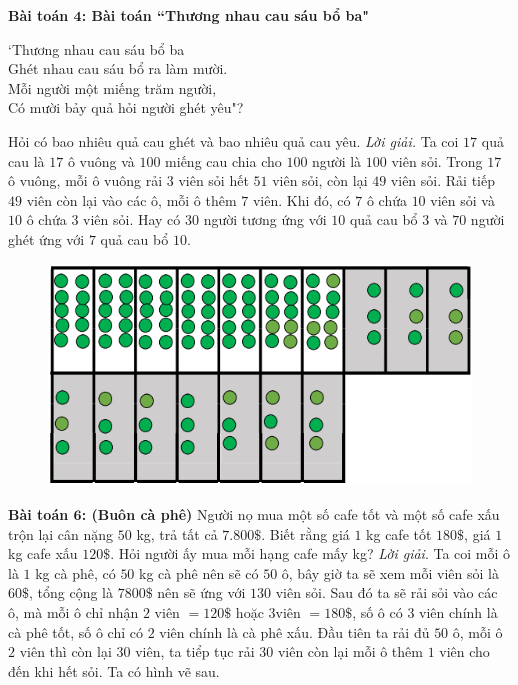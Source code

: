\begin{multicols}{2}
\begin{figure}[H]
		\vspace*{-15pt}
	\end{figure}
	\textbf{\color{toancuabi}Bài toán $\pmb4$: Bài toán ``Thương nhau cau sáu bổ ba"}
	\begin{center}
		`Thương nhau cau sáu bổ ba\\
	Ghét nhau cau sáu bổ ra làm mười.\\
	 Mỗi người một miếng trăm người,\\
	Có mười bảy quả hỏi người ghét yêu"?
	\end{center}
	Hỏi có bao nhiêu quả cau ghét và bao nhiêu quả cau yêu.
	\vskip 0.1cm
	\textit{Lời giải.}
	Ta coi $17$ quả cau là $17$ ô vuông và $100$ miếng cau chia cho $100$ người là $100$ viên sỏi. Trong $17$ ô vuông, mỗi ô vuông rải $3$ viên sỏi hết $51$ viên sỏi, còn lại $49$ viên sỏi. Rải tiếp $49$ viên còn lại vào các ô, mỗi ô thêm $7$ viên. Khi đó, có $7$ ô chứa $10$ viên sỏi và $10$ ô chứa $3$ viên sỏi. Hay có $30$ người tương ứng với $10$ quả cau bổ $3$ và $70$ người ghét ứng với $7$ quả cau bổ $10$.
	\begin{figure}[H]
		\vspace*{-5pt}
		\centering
		\captionsetup{labelformat= empty, justification=centering}
		\includegraphics[width= 1\linewidth]{4}
		\vspace*{-15pt}
	\end{figure}
	\textbf{\color{toancuabi}Bài toán $\pmb6$: (Buôn cà phê)}
	\vskip 0.1cm
	Người nọ mua một số cafe tốt và một số cafe xấu trộn lại cân nặng $50$ kg, trả tất cả $7.800\$$. Biết rằng giá $1$ kg cafe tốt $180\$$, giá $1$ kg cafe xấu $120\$$. Hỏi người ấy mua mỗi hạng cafe mấy kg?
	\vskip 0.1cm
	\textit{Lời giải}.
	Ta coi mỗi ô là $1$ kg cà phê, có $50$ kg cà phê nên sẽ có $50$ ô, bây giờ ta sẽ xem mỗi viên sỏi là $60\$$, tổng cộng là $7800\$$ nên sẽ ứng với $130$ viên sỏi. Sau đó ta sẽ rải sỏi vào các ô, mà mỗi ô chỉ nhận $2$ viên $=120\$$ hoặc $3 $viên $=180\$$, số ô có $3$ viên chính là cà phê tốt, số ô chỉ có $2$ viên chính là cà phê xấu. Đầu tiên ta rải đủ $50$ ô, mỗi ô $2$ viên thì còn lại $30$ viên, ta tiểp tục rải $30$ viên còn lại mỗi ô thêm $1$ viên cho đến khi hết sỏi. Ta có hình vẽ sau.

\end{multicols}
